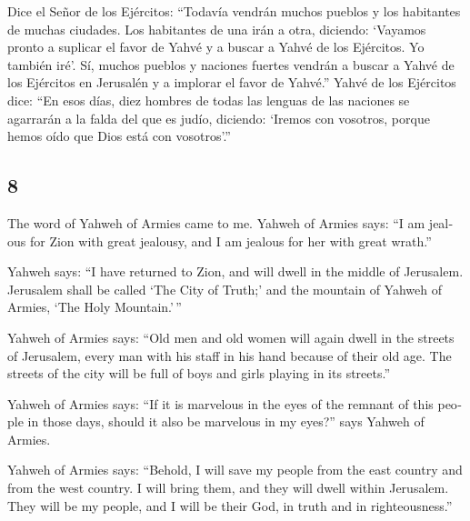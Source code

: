 \begin{paracol}{2}
 Dice el Señor de los Ejércitos: ``Todavía vendrán muchos
pueblos y los habitantes de muchas ciudades.  Los
habitantes de una irán a otra, diciendo: `Vayamos pronto a suplicar el
favor de Yahvé y a buscar a Yahvé de los Ejércitos. Yo también iré'.
 Sí, muchos pueblos y naciones fuertes vendrán a buscar a
Yahvé de los Ejércitos en Jerusalén y a implorar el favor de Yahvé.''
 Yahvé de los Ejércitos dice: ``En esos días, diez
hombres de todas las lenguas de las naciones se agarrarán a la falda del
que es judío, diciendo: `Iremos con vosotros, porque hemos oído que Dios
está con vosotros'.''

\switchcolumn
\begin{otherlanguage}{english}

\hypertarget{section-15}{%
\section{8}\label{section-15}}

 The word of Yahweh of Armies came to me. 
Yahweh of Armies says: ``I am jealous for Zion with great jealousy, and
I am jealous for her with great wrath.''

 Yahweh says: ``I have returned to Zion, and will dwell in
the middle of Jerusalem. Jerusalem shall be called `The City of Truth;'
and the mountain of Yahweh of Armies, `The Holy Mountain.'\,''

 Yahweh of Armies says: ``Old men and old women will again
dwell in the streets of Jerusalem, every man with his staff in his hand
because of their old age.  The streets of the city will be
full of boys and girls playing in its streets.''

 Yahweh of Armies says: ``If it is marvelous in the eyes
of the remnant of this people in those days, should it also be marvelous
in my eyes?'' says Yahweh of Armies.

 Yahweh of Armies says: ``Behold, I will save my people
from the east country and from the west country.  I will
bring them, and they will dwell within Jerusalem. They will be my
people, and I will be their God, in truth and in righteousness.''


\end{otherlanguage}
\end{paracol}
